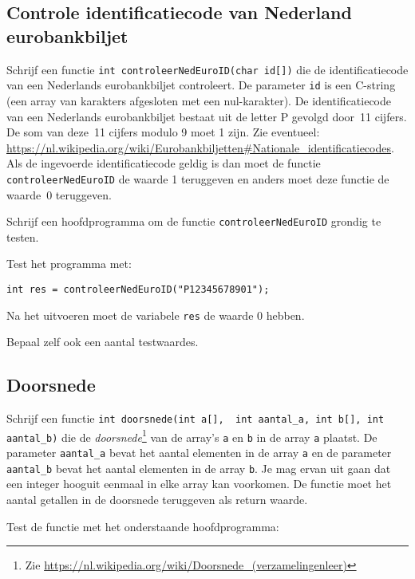 \documentclass[a4paper,10pt,fleqn,twoside]{article}
\begin{document}
\subsection{Controle identificatiecode van Nederland eurobankbiljet}
Schrijf een functie \lstinline|int controleerNedEuroID(char id[])| die de identificatiecode van een Nederlands eurobankbiljet controleert. De parameter \lstinline|id| is een C-string (een array van karakters afgesloten met een nul-karakter). De identificatiecode van een Nederlands eurobankbiljet bestaat uit de letter P gevolgd door~11 cijfers. De som van deze~11 cijfers modulo 9 moet 1 zijn. Zie eventueel: \url{https://nl.wikipedia.org/wiki/Eurobankbiljetten#Nationale_identificatiecodes}. Als de ingevoerde identificatiecode geldig is dan moet de functie \lstinline|controleerNedEuroID| de waarde 1 teruggeven en anders moet deze functie de waarde~0 teruggeven.

Schrijf een hoofdprogramma om de functie \lstinline|controleerNedEuroID| grondig te testen.

Test het programma met:

\begin{lstlisting}
int res = controleerNedEuroID("P12345678901");
\end{lstlisting}

Na het uitvoeren moet de variabele \lstinline|res| de waarde 0 hebben.

Bepaal zelf ook een aantal testwaardes.

\subsection{Doorsnede}
Schrijf een functie \mbox{\lstinline[columns=fixed]|int doorsnede(int a[],  int aantal_a, int b[], int aantal_b)|} die de \textsl{doorsnede}\footnote{Zie \url{https://nl.wikipedia.org/wiki/Doorsnede_(verzamelingenleer)}} van de array’s \lstinline|a| en \lstinline|b| in de array \lstinline|a| plaatst. De parameter \lstinline|aantal_a| bevat het aantal elementen in de array \lstinline|a| en de parameter \lstinline|aantal_b| bevat het aantal elementen in de array \lstinline|b|. Je mag ervan uit gaan dat een integer hooguit eenmaal in elke array kan voorkomen. De functie moet het aantal getallen in de doorsnede teruggeven als return waarde. 


Test de functie met het onderstaande hoofdprogramma:
\end{document}
